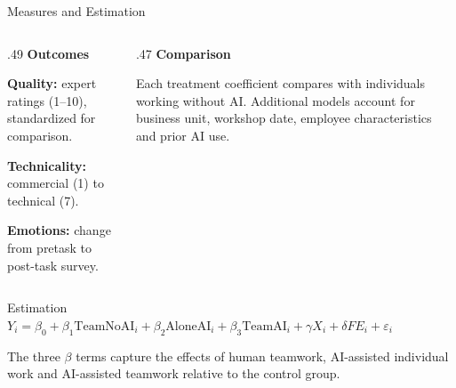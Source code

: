 \begin{frame}[t]{Measures and Estimation}
\small
\begin{columns}[T,onlytextwidth]
\begin{column}{.49\textwidth}
\textcolor{paperred}{\bfseries Outcomes}\par\smallskip
\textbf{Quality:} expert ratings (1--10), standardized for comparison.\par\smallskip
\textbf{Technicality:} commercial (1) to technical (7).\par\smallskip
\textbf{Emotions:} change from pretask to post-task survey.
\end{column}
\begin{column}{.47\textwidth}
\textcolor{paperred}{\bfseries Comparison}\par\smallskip
Each treatment coefficient compares with individuals working without AI. Additional models account for business unit, workshop date, employee characteristics and prior AI use.
\end{column}
\end{columns}

\vspace{0.55cm}
\begin{block}{Estimation}
\centering
{\footnotesize $Y_i=\beta_0+\beta_1\mathrm{TeamNoAI}_i+\beta_2\mathrm{AloneAI}_i+\beta_3\mathrm{TeamAI}_i+\gamma X_i+\delta FE_i+\varepsilon_i$}\par\smallskip
\raggedright The three $\beta$ terms capture the effects of human teamwork, AI-assisted individual work and AI-assisted teamwork relative to the control group.
\end{block}
\end{frame}
